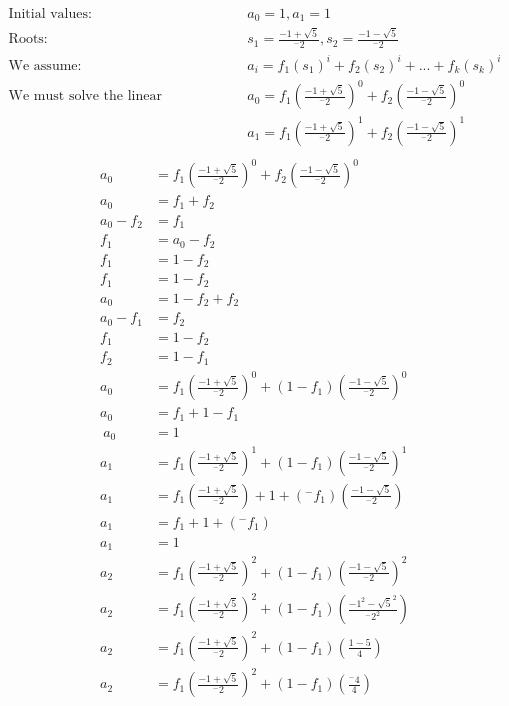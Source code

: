 \documentclass{article}
\begin{document}
\begin{align*}
\text{Initial values:} & \qquad a_0 = 1, a_1 = 1 \\
\text{Roots:} & \qquad s_1 =  \frac{-1 + \sqrt{5}}{^{-}2}, s_2 = \frac{-1 - \sqrt{5}}{^{-}2} \\
\text{We assume:} & \qquad a_i = f_1(s_1)^i + f_2(s_2)^i + ... + f_k(s_k)^i \\ 
\text{We must solve the linear equation:} 
& \qquad a_0 = f_1(\frac{-1 + \sqrt{5}}{^{-}2})^0 + f_2(\frac{-1 - \sqrt{5}}{^{-}2})^0 \\
& \qquad a_1 = f_1(\frac{-1 + \sqrt{5}}{^{-}2})^1 + f_2(\frac{-1 - \sqrt{5}}{^{-}2})^1 \\
\end{align*}
\begin{align*}
a_0 &= f_1(\frac{-1 + \sqrt{5}}{^{-}2})^0 + f_2(\frac{-1 - \sqrt{5}}{^{-}2})^0 \\
a_0 &= f_1 + f_2 \\ 
a_0 - f_2 &= f_1  \\ 
f_1 &= a_0 - f_2 \\ 
f_1 &= 1 - f_2 \\ 
f_1 &= 1 - f_2 \\ 
a_0 &= 1 - f_2 + f_2 \\ 
a_0 - f_1 &= f_2 \\ 
f_1 &= 1 - f_2 \\ 
f_2 &= 1 - f_1 \\ 
a_0 &= f_1(\frac{-1 + \sqrt{5}}{^{-}2})^0 + (1 - f_1)(\frac{-1 - \sqrt{5}}{^{-}2})^0 \\
a_0 &= f_1 + 1 - f_1 \\\
a_0 &= 1 \\
a_1 &= f_1(\frac{-1 + \sqrt{5}}{^{-}2})^1 + (1 - f_1)(\frac{-1 - \sqrt{5}}{^{-}2})^1 \\
a_1 &= f_1(\frac{-1 + \sqrt{5}}{^{-}2}) + 1 + (^{-}f_1)(\frac{-1 - \sqrt{5}}{^{-}2}) \\
a_1 &= f_1 + 1 + (^{-}f_1) \\
a_1 &= 1  \\
a_2 &= f_1(\frac{-1 + \sqrt{5}}{^{-}2})^2 + (1 - f_1)(\frac{-1 - \sqrt{5}}{^{-}2})^2 \\
a_2 &= f_1(\frac{-1 + \sqrt{5}}{^{-}2})^2 + (1 - f_1)(\frac{-1^2 - \sqrt{5}^2}{^{-}2^2}) \\
a_2 &= f_1(\frac{-1 + \sqrt{5}}{^{-}2})^2 + (1 - f_1)(\frac{1 - 5}{4}) \\
a_2 &= f_1(\frac{-1 + \sqrt{5}}{^{-}2})^2 + (1 - f_1)(\frac{^{-}4}{4}) \\
\end{align*}
\end{document}
